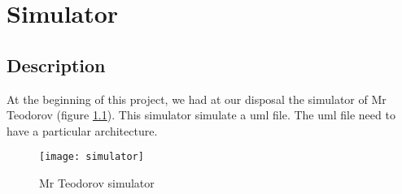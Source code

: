 
\chapter{Simulator}

\section{Description}


At the beginning of this project, we had at our disposal the simulator of Mr Teodorov (figure \ref{fig:sim}). This simulator simulate a uml file. The uml file need to have a particular architecture. 

\begin{figure}[h]
  \centering
  \texttt{[image: simulator]}
  \caption{Mr Teodorov simulator}
  \label{fig:sim}
\end{figure}




